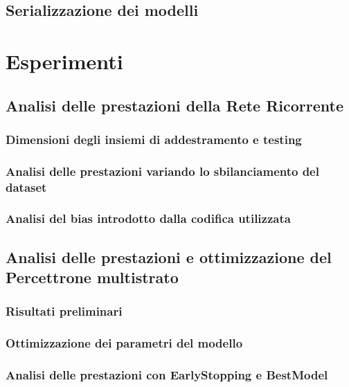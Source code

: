 \documentclass{article}
\begin{document}
\subsection{Serializzazione dei modelli}

\section{Esperimenti}

\subsection{Analisi delle prestazioni della Rete Ricorrente}
\subsubsection{Dimensioni degli insiemi di addestramento e testing}
\subsubsection{Analisi delle prestazioni variando lo sbilanciamento del dataset}
\subsubsection{Analisi del bias introdotto dalla codifica utilizzata}

\subsection{Analisi delle prestazioni e ottimizzazione del Percettrone multistrato}
\subsubsection{Risultati preliminari}
\subsubsection{Ottimizzazione dei parametri del modello} %
\subsubsection{Analisi delle prestazioni con EarlyStopping e BestModel}
\end{document}
